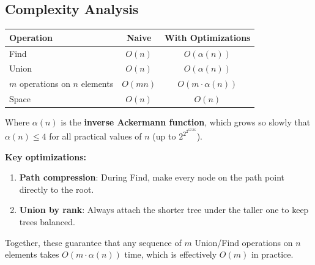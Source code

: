 \begin{animation}[id="uf-walkthrough", label="Union-Find with Path Compression"]
\step
{}

\step
{}
\endforeach
{}
\endforeach
{}

\end{animation}

\subsection{Complexity Analysis}

\begin{tabular}{|l|c|c|}
\hline
\textbf{Operation} & \textbf{Naive} & \textbf{With Optimizations} \\
\hline
Find & $O(n)$ & $O(\alpha(n))$ \\
\hline
Union & $O(n)$ & $O(\alpha(n))$ \\
\hline
$m$ operations on $n$ elements & $O(mn)$ & $O(m \cdot \alpha(n))$ \\
\hline
Space & $O(n)$ & $O(n)$ \\
\hline
\end{tabular}

Where $\alpha(n)$ is the \textbf{inverse Ackermann function}, which grows so slowly that
$\alpha(n) \leq 4$ for all practical values of $n$ (up to $2^{2^{2^{65536}}}$).

\textbf{Key optimizations:}
\begin{enumerate}
\item \textbf{Path compression}: During Find, make every node on the path point directly to the root.
\item \textbf{Union by rank}: Always attach the shorter tree under the taller one to keep trees balanced.
\end{enumerate}

Together, these guarantee that any sequence of $m$ Union/Find operations on $n$ elements
takes $O(m \cdot \alpha(n))$ time, which is effectively $O(m)$ in practice.
